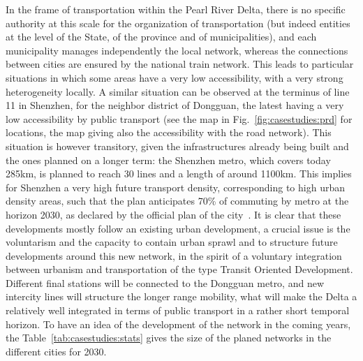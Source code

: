 In the frame of transportation within the Pearl River Delta, there is no specific authority at this scale for the organization of transportation (but indeed entities at the level of the State, of the province and of municipalities), and each municipality manages independently the local network, whereas the connections between cities are ensured by the national train network. This leads to particular situations in which some areas have a very low accessibility, with a very strong heterogeneity locally.  A similar situation can be observed at the terminus of line 11 in Shenzhen, for the neighbor district of Dongguan, the latest having a very low accessibility by public transport (see the map in Fig.~\ref{fig:casestudies:prd} for locations, the map giving also the accessibility with the road network). This situation is however transitory, given the infrastructures already being built and the ones planned on a longer term: the Shenzhen metro, which covers today 285km, is planned to reach 30 lines and a length of around 1100km. This implies for Shenzhen a very high future transport density, corresponding to high urban density areas, such that the plan anticipates 70\% of commuting by metro at the horizon 2030, as declared by the official plan of the city~\citep{shenzhen2016plan}. It is clear that these developments mostly follow an existing urban development, a crucial issue is the voluntarism and the capacity to contain urban sprawl and to structure future developments around this new network, in the spirit of a voluntary integration between urbanism and transportation of the type Transit Oriented Development. Different final stations will be connected to the Dongguan metro, and new intercity lines will structure the longer range mobility, what will make the Delta a relatively well integrated in terms of public transport in a rather short temporal horizon. To have an idea of the development of the network in the coming years, the Table~\ref{tab:casestudies:stats} gives the size of the planed networks in the different cities for 2030.

